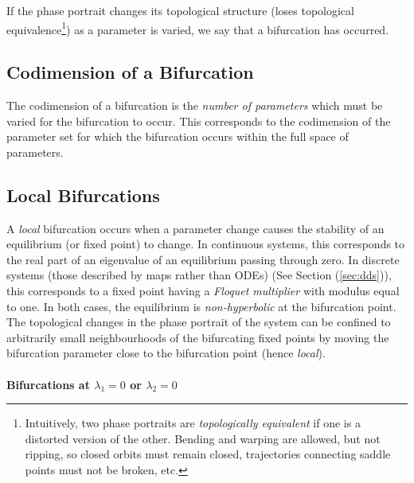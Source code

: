 If the phase portrait changes its topological structure (loses topological equivalence\footnote{Intuitively, two phase portraits are \emph{topologically equivalent} if one is a distorted version of the other. Bending and warping are allowed, but not ripping, so closed orbits must remain closed, trajectories connecting saddle points must not be broken, etc.}) as a parameter is varied, we say that a bifurcation has occurred.
\subsection{Codimension of a Bifurcation}
The codimension of a bifurcation is the \emph{number of parameters} which must be varied for the bifurcation to occur.
This corresponds to the codimension of the parameter set for which the bifurcation occurs within the full space of parameters.
\subsection{Local Bifurcations}{\label{sec:lb}}
A \emph{local} bifurcation occurs when a parameter change causes the stability of an equilibrium (or fixed point) to change.
In continuous systems, this corresponds to the real part of an eigenvalue of an equilibrium passing through zero.
In discrete systems (those described by maps rather than ODEs) (See Section (\ref{sec:dds})), this corresponds to a fixed point having a \emph{Floquet multiplier} with modulus equal to one.
In both cases, the equilibrium is \emph{non-hyperbolic} at the bifurcation point.
The topological changes in the phase portrait of the system can be confined to arbitrarily small neighbourhoods of the bifurcating fixed points by moving the bifurcation parameter close to the bifurcation point (hence \emph{local}).\\\\
\textbullet\quad\textbf{Bifurcations at $\lambda_1=0$ or $\lambda_2=0$}
